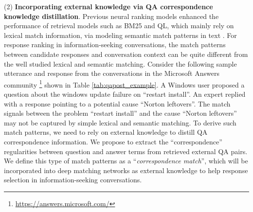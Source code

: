 (2) \textbf{Incorporating external knowledge via QA correspondence knowledge distillation}. Previous neural ranking models enhanced the performance of retrieval models such as BM25 and QL, which mainly rely on lexical match information, via modeling semantic match patterns in text \cite{Guo:2016:DRM:2983323.2983769,DBLP:conf/cikm/HuangHGDAH13,Mitra:2017:LMU:3038912.3052579}. For response ranking in information-seeking conversations, the match patterns between candidate responses and conversation context can be quite different from the well studied lexical and semantic matching. Consider the following sample utterance and response from the conversations in the Microsoft Answers community \footnote{\url{https://answers.microsoft.com/}} shown in Table \ref{tab:qapost_example}. A Windows user proposed a question about the windows update failure on ``restart install''. An expert replied with a response pointing to a potential cause ``Norton leftovers''. The match signals between the problem ``restart install'' and the cause ``Norton leftovers'' may not be captured by simple lexical and semantic matching. To derive such match patterns, we need to rely on external knowledge to distill QA correspondence information. We propose to extract the ``correspondence'' regularities between question and answer terms from retrieved external QA pairs. We define this type of match patterns as a ``\textit{correspondence match}'', which will be incorporated into deep matching networks as external knowledge to help response selection in information-seeking conversations. 



